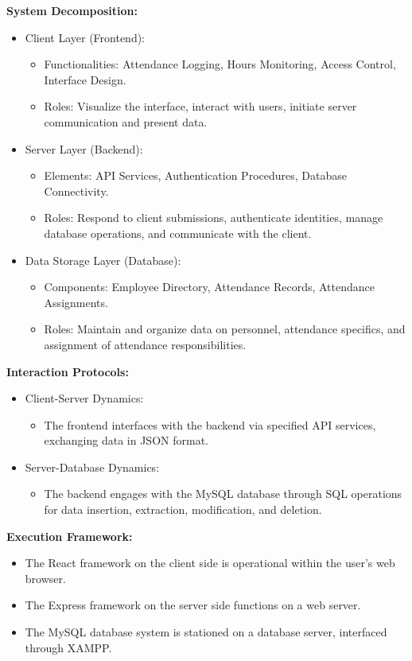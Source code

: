 \documentclass[a4paper, 12pt]{article}
\begin{document}
\textbf{System Decomposition:}
\begin{itemize}
    \item Client Layer (Frontend):
    \begin{itemize}
        \item Functionalities: Attendance Logging, Hours Monitoring, Access Control, Interface Design.
        \item Roles: Visualize the interface, interact with users, initiate server communication and present data.
    \end{itemize}
    \item Server Layer (Backend):
    \begin{itemize}
        \item Elements: API Services, Authentication Procedures, Database Connectivity.
        \item Roles: Respond to client submissions, authenticate identities, manage database operations, and communicate with the client.
    \end{itemize}
    \newpage
    \item Data Storage Layer (Database):
    \begin{itemize}
        \item Components: Employee Directory, Attendance Records, Attendance Assignments.
        \item Roles: Maintain and organize data on personnel, attendance specifics, and assignment of attendance responsibilities.
    \end{itemize}
\end{itemize}

\textbf{Interaction Protocols:}
\begin{itemize}
    \item Client-Server Dynamics:
    \begin{itemize}
        \item The frontend interfaces with the backend via specified API services, exchanging data in JSON format.
    \end{itemize}
    \item Server-Database Dynamics:
    \begin{itemize}
        \item The backend engages with the MySQL database through SQL operations for data insertion, extraction, modification, and deletion.
    \end{itemize}
\end{itemize}

\textbf{Execution Framework:}
\begin{itemize}
    \item The React framework on the client side is operational within the user’s web browser.
    \item The Express framework on the server side functions on a web server.
    \item The MySQL database system is stationed on a database server, interfaced through XAMPP.
\end{itemize}
\end{document}
